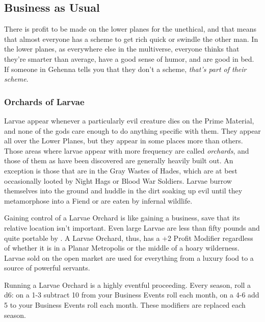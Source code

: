 

\subsection{Business as Usual}

There is profit to be made on the lower planes for the unethical, and that means that almost everyone has a scheme to get rich quick or swindle the other man. In the lower planes, as everywhere else in the multiverse, everyone thinks that they're smarter than average, have a good sense of humor, and are good in bed. If someone in Gehenna tells you that they don't a scheme, \textit{that's part of their scheme}.

\subsubsection{Orchards of Larvae}

Larvae appear whenever a particularly evil creature dies on the Prime Material, and none of the gods care enough to do anything specific with them. They appear all over the Lower Planes, but they appear in some places more than others. Those areas where larvae appear with more frequency are called \textit{orchards}, and those of them as have been discovered are generally heavily built out. An exception is those that are in the Gray Wastes of Hades, which are at best occasionally looted by Night Hags or Blood War Soldiers. Larvae burrow themselves into the ground and huddle in the dirt soaking up evil until they metamorphose into a Fiend or are eaten by infernal wildlife.

Gaining control of a Larvae Orchard is like gaining a business, save that its relative location isn't important. Even large Larvae are less than fifty pounds and quite portable by . A Larvae Orchard, thus, has a +2 Profit Modifier regardless of whether it is in a Planar Metropolis or the middle of a hoary wilderness. Larvae sold on the open market are used for everything from a luxury food to a source of powerful servants.


Running a Larvae Orchard is a highly eventful proceeding. Every season, roll a d6: on a 1-3 subtract 10 from your Business Events roll each month, on a 4-6 add 5 to your Business Events roll each month. These modifiers are replaced each season.

